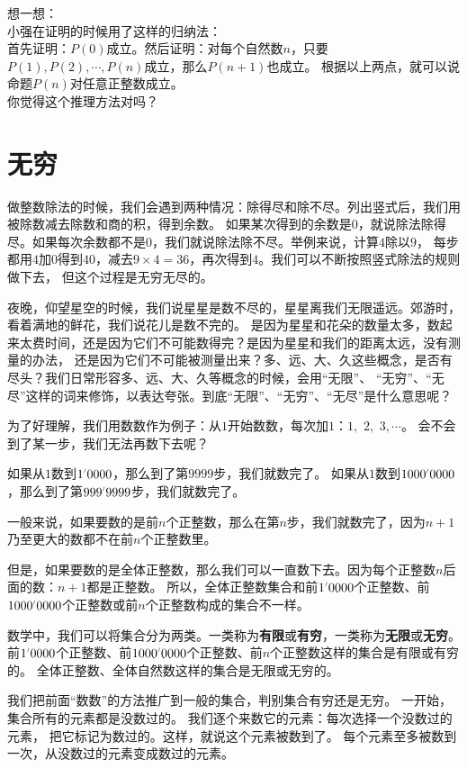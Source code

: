 \documentclass[12pt,UTF8]{ctexbook}
\begin{document}
\begin{sk}\label{sk:2-2-1}
    想一想：\\
    小强在证明的时候用了这样的归纳法：\\
    首先证明：$P(0)$成立。然后证明：对每个自然数$n$，只要$P(1), P(2), \cdots , P(n)$成立，那么$P(n+1)$也成立。
    根据以上两点，就可以说命题$P(n)$对任意正整数成立。\\
    你觉得这个推理方法对吗？
\end{sk}

\section{无穷}
做整数除法的时候，我们会遇到两种情况：除得尽和除不尽。列出竖式后，我们用被除数减去除数和商的积，得到余数。
如果某次得到的余数是$0$，就说除法除得尽。如果每次余数都不是$0$，我们就说除法除不尽。举例来说，计算$4$除以$9$，
每步都用$4$加$0$得到$40$，减去$9\times 4=36$，再次得到$4$。我们可以不断按照竖式除法的规则做下去，
但这个过程是无穷无尽的。

夜晚，仰望星空的时候，我们说星星是数不尽的，星星离我们无限遥远。郊游时，看着满地的鲜花，我们说花儿是数不完的。
是因为星星和花朵的数量太多，数起来太费时间，还是因为它们不可能数得完？是因为星星和我们的距离太远，没有测量的办法，
还是因为它们不可能被测量出来？多、远、大、久这些概念，是否有尽头？我们日常形容多、远、大、久等概念的时候，会用“无限”、
“无穷”、“无尽”这样的词来修饰，以表达夸张。到底“无限”、“无穷”、“无尽”是什么意思呢？

为了好理解，我们用数数作为例子：从$1$开始数数，每次加$1$：$1,\,\,2,\,\,3,\cdots$。
会不会到了某一步，我们无法再数下去呢？

如果从$1$数到$1\dlim{0000}$，那么到了第$9999$步，我们就数完了。
如果从$1$数到$1000\dlim{0000}$，那么到了第$999\dlim{9999}$步，我们就数完了。

一般来说，如果要数的是前$n$个正整数，那么在第$n$步，我们就数完了，因为$n+1$乃至更大的数都不在前$n$个正整数里。

但是，如果要数的是全体正整数，那么我们可以一直数下去。因为每个正整数$n$后面的数：$n+1$都是正整数。
所以，全体正整数集合和前$1\dlim{0000}$个正整数、前$1000\dlim{0000}$个正整数或前$n$个正整数构成的集合不一样。

数学中，我们可以将集合分为两类。一类称为\textbf{有限}或\textbf{有穷}，一类称为\textbf{无限}或\textbf{无穷}。
前$1\dlim{0000}$个正整数、前$1000\dlim{0000}$个正整数、前$n$个正整数这样的集合是有限或有穷的。
全体正整数、全体自然数这样的集合是无限或无穷的。

我们把前面“数数”的方法推广到一般的集合，判别集合有穷还是无穷。
一开始，集合所有的元素都是没数过的。
我们逐个来数它的元素：每次选择一个没数过的元素，
把它标记为数过的。这样，就说这个元素被数到了。
每个元素至多被数到一次，从没数过的元素变成数过的元素。
\end{document}
